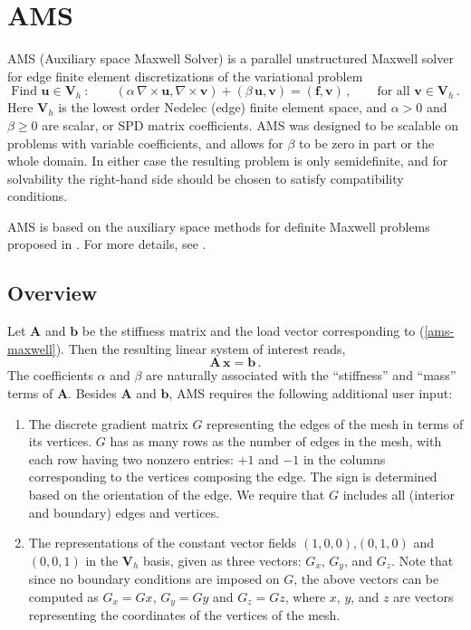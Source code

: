\section{AMS}
\label{AMS}

AMS (Auxiliary space Maxwell Solver) is a parallel unstructured Maxwell
solver for edge finite element discretizations of the variational problem
\begin{equation} \label{ams-maxwell}
\mbox{Find } {\mathbf u} \in {\mathbf V}_h \>:\qquad
(\alpha\, \nabla \times {\mathbf u},  \nabla \times {\mathbf v}) +
(\beta\, {\mathbf u},  {\mathbf v}) = ({\mathbf f},  {\mathbf v})\,,
\qquad \mbox{for all } {\mathbf v} \in {\mathbf V}_h \,.
\end{equation}
Here ${\mathbf V}_h$ is the lowest order Nedelec (edge) finite element space,
and $\alpha>0$ and $\beta \ge 0$ are scalar, or SPD matrix coefficients.
AMS was designed to be scalable on problems with variable coefficients,
and allows for $\beta$ to be zero in part or the whole domain.
In either  case the resulting problem is only semidefinite, and for solvability
the right-hand side should be chosen to satisfy compatibility conditions.

AMS is based on the auxiliary space methods for definite Maxwell
problems proposed in \cite{xu_H_curl}.
For more details, see \cite{h_curl_amg_report,ams_report}.

\subsection{Overview}
Let ${\mathbf A}$ and ${\mathbf b}$ be the stiffness matrix and  the
load vector corresponding to (\ref{ams-maxwell}). Then the resulting
linear system of interest reads,
\begin{equation} \label{ams-maxwell-ls}
{\mathbf A}\, {\mathbf x} = {\mathbf b} \,.
\end{equation}
The coefficients $\alpha$ and $\beta$ are naturally associated with
the ``stiffness'' and ``mass'' terms of ${\mathbf A}$.
Besides ${\mathbf A}$ and ${\mathbf b}$, AMS requires the following
additional user input:
\begin{enumerate}
\item The discrete gradient matrix $G$ representing the edges of
the mesh in terms of its vertices. $G$ has as many rows as the number
of edges in the mesh, with each row having two nonzero entries:
$+1$ and $-1$ in the columns corresponding to the vertices composing
the edge. The sign is determined based on the orientation of the edge.
We require that $G$ includes all (interior and boundary) edges
and vertices.

\item The representations of the constant vector fields $(1,0,0)$,$(0,1,0)$ and
$(0,0,1)$ in the ${\mathbf V}_h$ basis, given as three vectors: $G_x$, $G_y$, and $G_z$.
Note that since no boundary conditions are imposed on $G$, the above vectors
can be computed as $G_x = G x$, $G_y = G y$ and $G_z = G z$, where
$x$, $y$, and $z$ are vectors representing the coordinates of the vertices of the mesh.
\end{enumerate}

